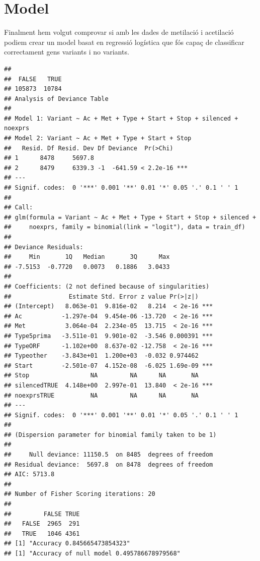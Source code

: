 \documentclass{article}\usepackage[]{graphicx}\usepackage[]{color}
\makeatletter
\newenvironment{kframe}{%
 \def\at@end@of@kframe{}%
 \ifinner\ifhmode%
  \def\at@end@of@kframe{\end{minipage}}%
  \begin{minipage}{\columnwidth}%
 \fi\fi%
 \def\FrameCommand##1{\hskip\@totalleftmargin \hskip-\fboxsep
 \colorbox{shadecolor}{##1}\hskip-\fboxsep
     \hskip-\linewidth \hskip-\@totalleftmargin \hskip\columnwidth}%
 \MakeFramed {\advance\hsize-\width
   \@totalleftmargin\z@ \linewidth\hsize
   \@setminipage}}%
 {\par\unskip\endMakeFramed%
 \at@end@of@kframe}
\newenvironment{knitrout}{}{} %
\makeatother
\begin{document}
\section{Model}
Finalment hem volgut comprovar si amb les dades de metilació i acetilació podiem crear un model basat en regressió logística que fós capaç de classificar correctament gens variants i no variants.
\begin{knitrout}
\color{fgcolor}\begin{kframe}
\begin{verbatim}
## 
##  FALSE   TRUE 
## 105873  10784
## Analysis of Deviance Table
## 
## Model 1: Variant ~ Ac + Met + Type + Start + Stop + silenced + noexprs
## Model 2: Variant ~ Ac + Met + Type + Start + Stop
##   Resid. Df Resid. Dev Df Deviance  Pr(>Chi)    
## 1      8478     5697.8                          
## 2      8479     6339.3 -1  -641.59 < 2.2e-16 ***
## ---
## Signif. codes:  0 '***' 0.001 '**' 0.01 '*' 0.05 '.' 0.1 ' ' 1
## 
## Call:
## glm(formula = Variant ~ Ac + Met + Type + Start + Stop + silenced + 
##     noexprs, family = binomial(link = "logit"), data = train_df)
## 
## Deviance Residuals: 
##     Min       1Q   Median       3Q      Max  
## -7.5153  -0.7720   0.0073   0.1886   3.0433  
## 
## Coefficients: (2 not defined because of singularities)
##                Estimate Std. Error z value Pr(>|z|)    
## (Intercept)   8.063e-01  9.816e-02   8.214  < 2e-16 ***
## Ac           -1.297e-04  9.454e-06 -13.720  < 2e-16 ***
## Met           3.064e-04  2.234e-05  13.715  < 2e-16 ***
## Type5prima   -3.511e-01  9.901e-02  -3.546 0.000391 ***
## TypeORF      -1.102e+00  8.637e-02 -12.758  < 2e-16 ***
## Typeother    -3.843e+01  1.200e+03  -0.032 0.974462    
## Start        -2.501e-07  4.152e-08  -6.025 1.69e-09 ***
## Stop                 NA         NA      NA       NA    
## silencedTRUE  4.148e+00  2.997e-01  13.840  < 2e-16 ***
## noexprsTRUE          NA         NA      NA       NA    
## ---
## Signif. codes:  0 '***' 0.001 '**' 0.01 '*' 0.05 '.' 0.1 ' ' 1
## 
## (Dispersion parameter for binomial family taken to be 1)
## 
##     Null deviance: 11150.5  on 8485  degrees of freedom
## Residual deviance:  5697.8  on 8478  degrees of freedom
## AIC: 5713.8
## 
## Number of Fisher Scoring iterations: 20
##        
##         FALSE TRUE
##   FALSE  2965  291
##   TRUE   1046 4361
## [1] "Accuracy 0.845665473854323"
## [1] "Accuracy of null model 0.495786678979568"
\end{verbatim}



\end{kframe}
\end{knitrout}
\end{document}
